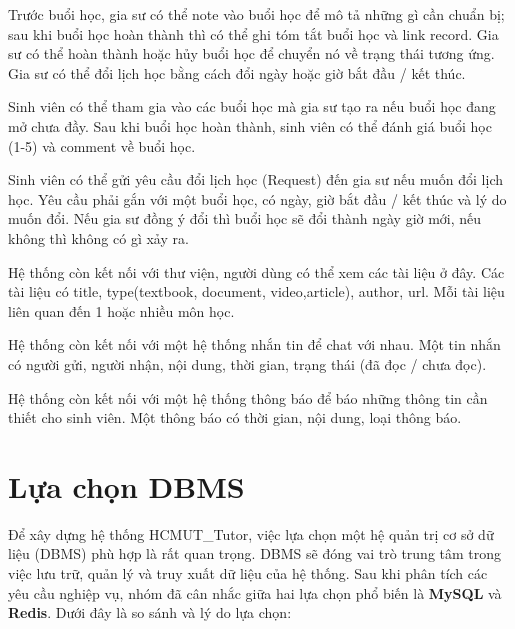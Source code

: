 Trước buổi học, gia sư có thể note vào buổi học để mô tả những gì cần chuẩn bị; sau khi buổi học hoàn thành thì có thể ghi tóm tắt buổi học và link record. Gia sư có thể hoàn thành hoặc hủy buổi học để chuyển nó về trạng thái tương ứng. Gia sư có thể đổi lịch học bằng cách đổi ngày hoặc giờ bắt đầu / kết thúc.


Sinh viên có thể tham gia vào các buổi học mà gia sư tạo ra nếu buổi học đang mở chưa đầy. Sau khi buổi học hoàn thành, sinh viên có thể đánh giá buổi học (1-5) và comment về buổi học. 


Sinh viên có thể gửi yêu cầu đổi lịch học (Request) đến gia sư nếu muốn đổi lịch học. Yêu cầu phải gắn với một buổi học, có ngày, giờ bắt đầu / kết thúc và lý do muốn đổi. Nếu gia sư đồng ý đổi thì buổi học sẽ đổi thành ngày giờ mới, nếu không thì không có gì xảy ra. 


Hệ thống còn kết nối với thư viện, người dùng có thể xem các tài liệu ở đây. Các tài liệu có title, type(textbook, document, video,article), author, url. Mỗi tài liệu liên quan đến 1 hoặc nhiều môn học.


Hệ thống còn kết nối với một hệ thống nhắn tin để chat với nhau. Một tin nhắn có người gửi, người nhận, nội dung, thời gian, trạng thái (đã đọc / chưa đọc).


Hệ thống còn kết nối với một hệ thống thông báo để báo những thông tin cần thiết cho sinh viên. Một thông báo có thời gian, nội dung, loại thông báo.

\section{Lựa chọn DBMS}

Để xây dựng hệ thống HCMUT\_Tutor, việc lựa chọn một hệ quản trị cơ sở dữ liệu (DBMS) phù hợp là rất quan trọng. DBMS sẽ đóng vai trò trung tâm trong việc lưu trữ, quản lý và truy xuất dữ liệu của hệ thống. Sau khi phân tích các yêu cầu nghiệp vụ, nhóm đã cân nhắc giữa hai lựa chọn phổ biến là \textbf{MySQL} và \textbf{Redis}. Dưới đây là so sánh và lý do lựa chọn:

